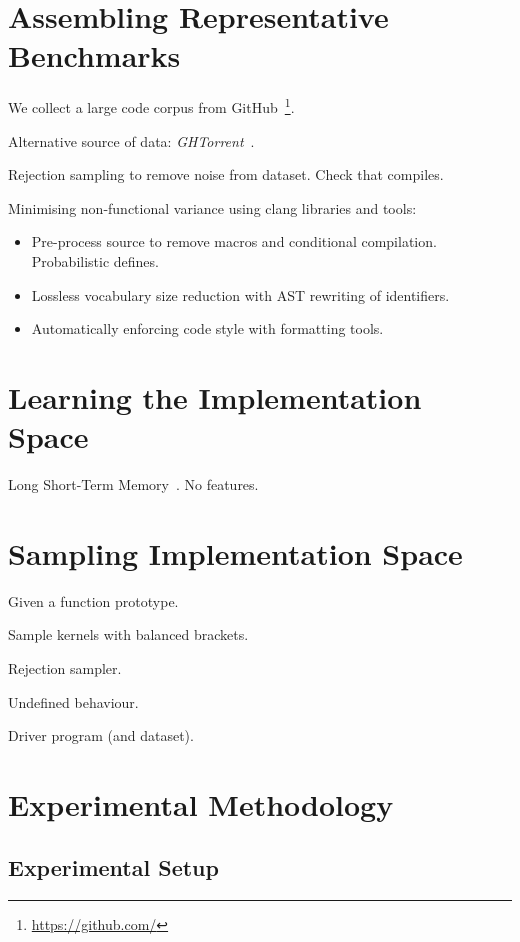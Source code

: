 \documentclass[preprint,nonatbib,10pt,nocopyrightspace]{sigplanconf}
\begin{document}
\section{Assembling Representative Benchmarks}\label{sec:}

We collect a large code corpus from
GitHub~\footnote{\url{https://github.com/}}.

Alternative source of data: \emph{GHTorrent}~\cite{Gousios2014a}.

Rejection sampling to remove noise from dataset. Check that compiles.

Minimising non-functional variance using clang libraries and tools:
\begin{itemize}
\item Pre-process source to remove macros and conditional
  compilation. Probabilistic defines.
\item Lossless vocabulary size reduction with AST rewriting of
  identifiers.
\item Automatically enforcing code style with formatting tools.
\end{itemize}

\section{Learning the Implementation Space}\label{sec:ml}

Long Short-Term Memory~\cite{Hochreiter1997}. No features.


\section{Sampling Implementation Space}\label{sec:}

Given a function prototype.

Sample kernels with balanced brackets.

Rejection sampler.

Undefined behaviour.

Driver program (and dataset).


\section{Experimental Methodology}\label{sec:evaluation}


\subsection{Experimental Setup}\label{subsec:}
\end{document}
